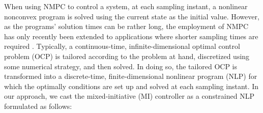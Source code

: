 When using NMPC to control a system, at each sampling instant, a nonlinear nonconvex program is solved using the current state as the initial value. However, as the programs' solution times can be rather long, the employment of NMPC has only recently been extended to applications where shorter sampling times are required \cite{barros2020b}. Typically, a continuous-time, infinite-dimensional optimal control problem (OCP) is tailored according to the problem at hand, discretized using some numerical strategy, and then solved. In doing so, the tailored OCP is transformed into a discrete-time, finite-dimensional nonlinear program (NLP) for which the optimally conditions are set up and solved at each sampling instant. In our approach, we cast the mixed-initiative (MI) controller as a constrained NLP formulated as follows:

